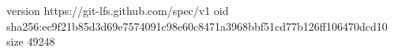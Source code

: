 version https://git-lfs.github.com/spec/v1
oid sha256:ec9f21b85d3d69e7574091c98e60c8471a3968bbf51cd77b126ff106470dcd10
size 49248

